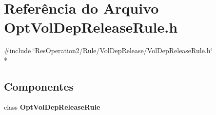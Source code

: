\section{Referência do Arquivo Opt\+Vol\+Dep\+Release\+Rule.\+h}
\label{_opt_vol_dep_release_rule_8h}
{\ttfamily \#include \char`\"{}Res\+Operation2/\+Rule/\+Vol\+Dep\+Release/\+Vol\+Dep\+Release\+Rule.\+h\char`\"{}}\\*
\subsection*{Componentes}
\begin{DoxyCompactItemize}
\item 
class {\bf Opt\+Vol\+Dep\+Release\+Rule}
\end{DoxyCompactItemize}
